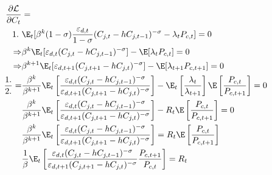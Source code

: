 \begin{align}
    \frac{\partial \mathcal{L}}{\partial C_t} & =                                                                                                                                                                                                                                                             \\
    1.\                                       & \E_t[\beta^k (1-\sigma) \frac{\varepsilon_{d,t}}{1-\sigma}(C_{j,t} - hC_{j,t-1})^{-\sigma}-\lambda_t P_{c,t}] = 0                                                                                                                                             \\
    \Rightarrow                               & \beta^k \E_t[ \varepsilon_{d,t}(C_{j,t} - hC_{j,t-1})^{-\sigma}] - \E[\lambda_t P_{c,t}]  =0                                                                                                                                                                  \\
    \Rightarrow                               & \beta^{k+1} \E_t[ \varepsilon_{d,t+1}(C_{j,t+1} - hC_{j,t})^{-\sigma}] - \E[\lambda_{t+1} P_{c,t+1}]  =0                                                                                                                                                      \\
    \frac{1.}{2.} =                           & \frac{\beta^k}{\beta^{k+1}}\E_t\left[ \frac{\varepsilon_{d,t}(C_{j,t} - hC_{j,t-1})^{-\sigma}}{\varepsilon_{d,t+1}(C_{j,t+1} - hC_{j,t})^{-\sigma}}\right] - \E_t\left[ \frac{\lambda_t }{\lambda_{t+1}}\right] \E\left[\frac{P_{c,t}}{P_{c,t+1}} \right] = 0 \\
                                              & \frac{\beta^k}{\beta^{k+1}}\E_t\left[ \frac{\varepsilon_{d,t}(C_{j,t} - hC_{j,t-1})^{-\sigma}}{\varepsilon_{d,t+1}(C_{j,t+1} - hC_{j,t})^{-\sigma}}\right] - R_t \E\left[\frac{P_{c,t}}{P_{c,t+1}} \right] = 0                                                \\
                                              & \frac{\beta^k}{\beta^{k+1}}\E_t\left[ \frac{\varepsilon_{d,t}(C_{j,t} - hC_{j,t-1})^{-\sigma}}{\varepsilon_{d,t+1}(C_{j,t+1} - hC_{j,t})^{-\sigma}}\right]  = R_t \E\left[\frac{P_{c,t}}{P_{c,t+1}} \right]                                                   \\
                                              & \frac{1}{\beta}\E_t\left[ \frac{\varepsilon_{d,t}(C_{j,t} - hC_{j,t-1})^{-\sigma}}{\varepsilon_{d,t+1}(C_{j,t+1} - hC_{j,t})^{-\sigma}}\frac{P_{c,t+1}}{P_{c,t}}\right]  = R_t                                                                                \\

\end{align}
